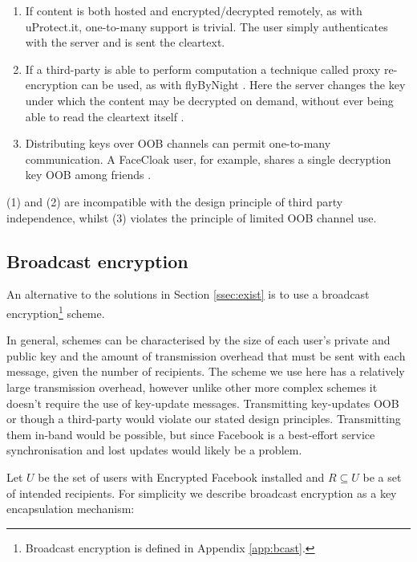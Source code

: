 \begin{enumerate}

    \item If content is both hosted and encrypted/decrypted remotely, as with uProtect.it, one-to-many support is trivial. The user simply authenticates with the server and is sent the cleartext.
    
    \item If a third-party is able to perform computation a technique called proxy re-encryption can be used, as with flyByNight \cite{flybynight}. Here the server changes the key under which the content may be decrypted on demand, without ever being able to read the cleartext itself \cite{proxy}.
    
    \item Distributing keys over OOB channels can permit one-to-many communication. A FaceCloak user, for example, shares a single decryption key OOB among friends \cite{facecloak}.

\end{enumerate}

(1) and (2) are incompatible with the design principle of third party independence, whilst (3) violates the principle of limited OOB channel use.

\FloatBarrier
\subsection{Broadcast encryption}

An alternative to the solutions in Section \ref{ssec:exist} is to use a broadcast encryption\footnote{Broadcast encryption is defined in Appendix \ref{app:bcast}.} scheme. 

In general, schemes can be characterised by the size of each user's private and public key and the amount of transmission overhead that must be sent with each message, given the number of recipients. The scheme we use here has a relatively large transmission overhead, however unlike other more complex schemes it doesn't require the use of key-update messages. Transmitting key-updates OOB or though a third-party would violate our stated design principles. Transmitting them in-band would be possible, but since Facebook is a best-effort service synchronisation and lost updates would likely be a problem.

Let $U$ be the set of users with Encrypted Facebook installed and $R \subseteq U$ be a set of intended recipients. For simplicity we describe broadcast encryption as a key encapsulation mechanism:


